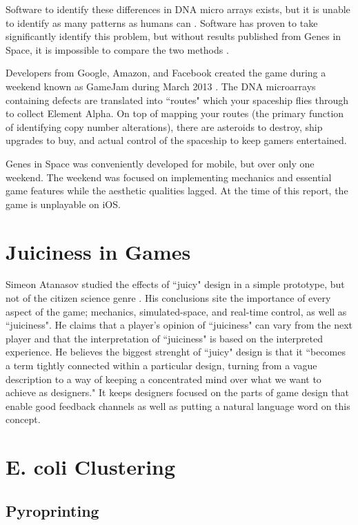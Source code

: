 Software to identify these differences in DNA micro arrays exists, but it is unable to identify as many patterns as humans can \cite{canthepower}. Software has proven to take significantly identify this problem, but without results published from Genes in Space, it is impossible to compare the two methods \cite{curtis2012genomic}.

Developers from Google, Amazon, and Facebook created the game during a weekend known as GameJam during March 2013 \cite{canthepower}. The DNA microarrays containing defects are translated into ``routes" which your spaceship flies through to collect Element Alpha. On top of mapping your routes (the primary function of identifying copy number alterations), there are asteroids to destroy, ship upgrades to buy, and actual control of the spaceship to keep gamers entertained.

Genes in Space was conveniently developed for mobile, but over only one weekend. The weekend was focused on implementing mechanics and essential game features while the aesthetic qualities lagged. At the time of this report, the game is unplayable on iOS. 

\section{Juiciness in Games}

Simeon Atanasov studied the effects of ``juicy" design in a simple prototype, but not of the citizen science genre \cite{atanasov}. His conclusions site the importance of every aspect of the game; mechanics, simulated-space, and real-time control, as well as ``juiciness". He claims that a player's opinion of ``juiciness" can vary from the next player and that the interpretation of ``juiciness" is based on the interpreted experience. He believes the biggest strenght of ``juicy" design is that it ``becomes a term tightly connected within a particular design, turning from a vague description to a way of keeping a concentrated mind over what we want to achieve as designers." \cite{atanasov} It keeps designers focused on the parts of game design that enable good feedback channels as well as putting a natural language word on this concept.

\section{E. coli Clustering}
\subsection{Pyroprinting}
\label{pyroprinting}

